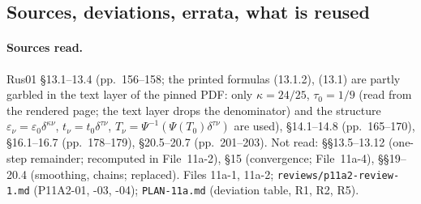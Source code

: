\subsection{Sources, deviations, errata, what is reused}\label{bpP:p11a:notes3}

\paragraph{Sources read.} Rus01 \S13.1--13.4 (pp.~156--158; the printed formulas (13.1.2), (13.1) are partly garbled in the text layer of the pinned PDF: only $\kappa=24/25$, $\tau_0=1/9$ (read from the rendered page; the text layer drops the denominator) and the structure $\varepsilon_\nu=\varepsilon_0\delta^{\kappa\nu}$, $t_\nu=t_0\delta^{\tau\nu}$, $T_\nu=\Psi^{-1}(\Psi(T_0)\delta^{\tau\nu})$ are used), \S14.1--14.8 (pp.~165--170), \S16.1--16.7 (pp.~178--179), \S20.5--20.7 (pp.~201--203). Not read: \S\S13.5--13.12 (one-step remainder; recomputed in File~11a-2), \S15 (convergence; File~11a-4), \S\S19--20.4 (smoothing, chains; replaced). Files 11a-1, 11a-2; \texttt{reviews/p11a2-review-1.md} (P11A2-01, -03, -04); \texttt{PLAN-11a.md} (deviation table, R1, R2, R5).

